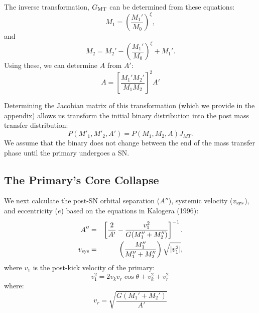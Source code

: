 \documentclass[12pt, preprint]{aastex}
\begin{document}
The inverse transformation, $G_{\rm MT}$ can be determined from these equations:
\begin{equation}
M_1 = \left( \frac{M_1'}{M_0} \right)^{\xi},
\end{equation}
and
\begin{equation}
M_2 = M_2' - \left( \frac{M_1'}{M_0} \right)^{\xi} + M_1'.
\end{equation}
Using these, we can determine $A$ from $A'$:
\begin{equation}
A = \left[ \frac{M_1' M_2'}{M_1 M_2} \right]^2 A'
\end{equation}



Determining the Jacobian matrix of this transformation (which we provide in the appendix) allows us transform the initial binary distribution into the post mass transfer distribution:
\begin{equation}
P(M'_1, M'_2, A') = P(M_1, M_2, A) J_{MT}. \label{eq:P_MT}
\end{equation}
We assume that the binary does not change between the end of the mass transfer phase until the primary undergoes a SN. 




\subsection{The Primary's Core Collapse}

We next calculate the post-SN orbital separation ($A''$), systemic velocity ($v_{\rm sys}$), and eccentricity ($e$) based on the equations in Kalogera (1996):
\begin{eqnarray}
A'' &=& \left[ \frac{2 }{A'}  - \frac{v_1^2}{G(M_1'' + M_2'')} \right]^{-1}. \label{eq:SN_A} \\
v_{\rm sys} &=& \left( \frac{M_1''}{M_1'' + M_2''} \right) \sqrt{ |v_1^2| }, \label{eq:SN_v_sys}
\end{eqnarray}
where $v_1$ is the post-kick velocity of the primary:
\begin{equation}
v_1^2 = 2v_k v_r \cos \theta + v_k^2 + v_r^2\, 
\end{equation}
where:
\begin{equation}
v_r = \sqrt{\frac{G (M_1' + M_2')}{A'}} \label{eq:v_r}
\end{equation}
\end{document}
